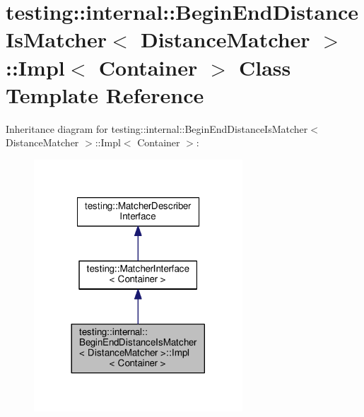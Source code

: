 \hypertarget{classtesting_1_1internal_1_1_begin_end_distance_is_matcher_1_1_impl}{}\section{testing\+:\+:internal\+:\+:Begin\+End\+Distance\+Is\+Matcher$<$ Distance\+Matcher $>$\+:\+:Impl$<$ Container $>$ Class Template Reference}
\label{classtesting_1_1internal_1_1_begin_end_distance_is_matcher_1_1_impl}


Inheritance diagram for testing\+:\+:internal\+:\+:Begin\+End\+Distance\+Is\+Matcher$<$ Distance\+Matcher $>$\+:\+:Impl$<$ Container $>$\+:
\nopagebreak
\begin{figure}[H]
\begin{center}
\leavevmode
\includegraphics[width=221pt]{classtesting_1_1internal_1_1_begin_end_distance_is_matcher_1_1_impl__inherit__graph}
\end{center}
\end{figure}


